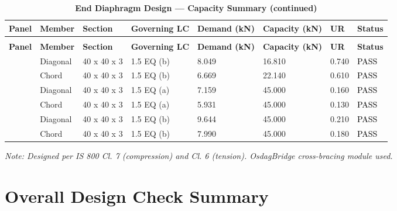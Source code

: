 \documentclass[12pt,a4paper]{report}
\numberwithin{table}{chapter}
\numberwithin{figure}{chapter}
\begin{document}
\begin{longtable}{|C{2.0cm}|L{1.8cm}|C{2.2cm}|C{3.0cm}|C{1.8cm}|C{1.8cm}|C{1.2cm}|C{1.8cm}|}
\caption{\textbf{End Diaphragm Design --- Capacity Summary}}\\
\hline
\textbf{Panel} & \textbf{Member} & \textbf{Section} & \textbf{Governing LC} & \textbf{Demand (kN)} & \textbf{Capacity (kN)} & \textbf{UR} & \textbf{Status} \\[6pt]
\hline
\endfirsthead
\caption[]{\textbf{End Diaphragm Design --- Capacity Summary (continued)}}\\
\hline
\textbf{Panel} & \textbf{Member} & \textbf{Section} & \textbf{Governing LC} & \textbf{Demand (kN)} & \textbf{Capacity (kN)} & \textbf{UR} & \textbf{Status} \\[6pt]
\hline
\endhead
\hline
\endfoot
\endlastfoot
{} & Diagonal & 40 x 40 x 3 & 1.5 EQ (b) & 8.049 & 16.810 & 0.740 & \textcolor{black}{PASS} \\[6pt]
 & Chord & 40 x 40 x 3 & 1.5 EQ (b) & 6.669 & 22.140 & 0.610 & \textcolor{black}{PASS} \\[6pt]
\hline
{} & Diagonal & 40 x 40 x 3 & 1.5 EQ (a) & 7.159 & 45.000 & 0.160 & \textcolor{black}{PASS} \\[6pt]
 & Chord & 40 x 40 x 3 & 1.5 EQ (a) & 5.931 & 45.000 & 0.130 & \textcolor{black}{PASS} \\[6pt]
\hline
{} & Diagonal & 40 x 40 x 3 & 1.5 EQ (b) & 9.644 & 45.000 & 0.210 & \textcolor{black}{PASS} \\[6pt]
 & Chord & 40 x 40 x 3 & 1.5 EQ (b) & 7.990 & 45.000 & 0.180 & \textcolor{black}{PASS} \\[6pt]
\hline
\end{longtable}
\noindent\textit{Note: Designed per IS 800 Cl. 7 (compression) and Cl. 6 (tension). OsdagBridge cross-bracing module used.}

\section{Overall Design Check Summary}
\label{sec:overall-summary}
\end{document}
